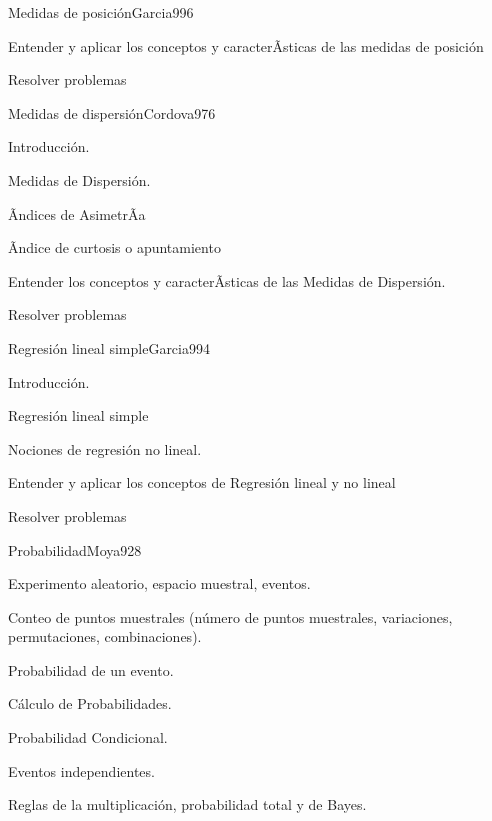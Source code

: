 \begin{syllabus}
\begin{unit}{Medidas de posición}{Garcia99}{6}
   \begin{unitgoals}
         \item  Entender y aplicar los conceptos y caracterÃ­sticas de las medidas de posición
         \item  Resolver problemas
   \end{unitgoals}
\end{unit}

\begin{unit}{Medidas de dispersión}{Cordova97}{6}
   \begin{topics}
         \item  Introducción.
	 \item  Medidas de Dispersión.
         \item  Ãndices de AsimetrÃ­a
	 \item  Ãndice de curtosis o apuntamiento
   \end{topics}

   \begin{unitgoals}
         \item  Entender los conceptos y caracterÃ­sticas de las Medidas de Dispersión.
         \item  Resolver problemas
   \end{unitgoals}
\end{unit}

\begin{unit}{Regresión lineal simple}{Garcia99}{4}
   \begin{topics}
         \item  Introducción.
	 \item  Regresión lineal simple
         \item  Nociones de regresión no lineal.
   \end{topics}

   \begin{unitgoals}
         \item  Entender y aplicar los conceptos de Regresión lineal y no lineal
         \item  Resolver problemas
   \end{unitgoals}
\end{unit}

\begin{unit}{Probabilidad}{Moya92}{8}
   \begin{topics}
         \item  Experimento aleatorio, espacio muestral, eventos.
	 \item  Conteo de puntos muestrales (número de puntos muestrales, variaciones, permutaciones, combinaciones).
         \item  Probabilidad de un evento.
	 \item  Cálculo de Probabilidades.
	\item Probabilidad Condicional.
	\item Eventos independientes.
	\item Reglas de la multiplicación, probabilidad total y de Bayes.
   \end{topics}


\end{unit}
\end{syllabus}
